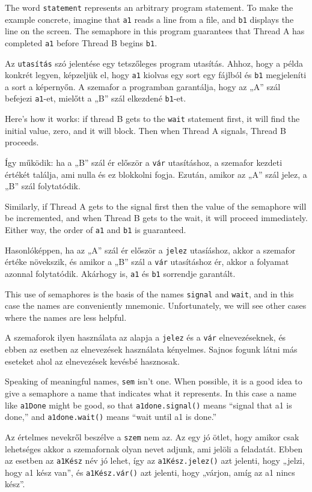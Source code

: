 \documentclass{book}
\begin{document}
The word {\tt statement} represents an arbitrary program statement.
To make the example concrete, imagine that {\tt a1} reads a line
from a file, and {\tt b1} displays the line on the screen.
The semaphore in this program guarantees that Thread A
has completed {\tt a1} before Thread B begins {\tt b1}.

Az {\tt utasítás} szó jelentése egy tetszőleges program utasítás.
Ahhoz, hogy a példa konkrét legyen, képzeljük el, hogy {\tt a1} kiolvas egy
sort egy fájlból és {\tt b1} megjeleníti a sort a képernyőn. A szemafor
a programban garantálja, hogy az „A” szál befejezi {\tt a1}-et, mielőtt
a „B” szál elkezdené {\tt b1}-et.

Here's how it works: if thread B gets to the
{\tt wait} statement first, it will find the initial
value, zero, and it will block.  Then when Thread A signals,
Thread B proceeds.

Így működik: ha a „B” szál ér először a {\tt vár} utasításhoz, a szemafor
kezdeti értékét találja, ami nulla és ez blokkolni fogja. Ezután, amikor
az „A” szál jelez, a „B” szál folytatódik.

Similarly, if Thread A gets to the signal first then the
value of the semaphore will be incremented, and when Thread
B gets to the wait, it will proceed immediately.
Either way, the order of {\tt a1} and {\tt b1} is guaranteed.

Hasonlóképpen, ha az „A” szál ér először a {\tt jelez} utasíáshoz, akkor a szemafor
értéke növekszik, és amikor a „B” szál a {\tt vár} utasításhoz ér, akkor a
folyamat azonnal folytatódik. Akárhogy is, {\tt a1} és {\tt b1}
sorrendje garantált.

This use of semaphores is the basis of the names {\tt signal}
and {\tt wait}, and in this case the names are conveniently
mnemonic.  Unfortunately, we will see other cases where the
names are less helpful.

A szemaforok ilyen használata az alapja a {\tt jelez} és a {\tt vár}
elnevezéseknek, és ebben az esetben az elnevezések használata kényelmes.
Sajnos fogunk látni más eseteket ahol az elnevezések kevésbé hasznosak.

Speaking of meaningful names, {\tt sem} isn't one.  When
possible, it is a good idea to give a semaphore a name
that indicates what it represents.  In this case a name like
{\tt a1Done} might be good, so that {\tt a1done.signal()} means
``signal that a1 is done,'' and {\tt a1done.wait()} means
``wait until a1 is done.''

Az értelmes nevekről beszélve a {\tt szem} nem az. Az egy jó ötlet,
hogy amikor csak lehetséges akkor a szemafornak olyan nevet adjunk,
ami jelöli a feladatát. Ebben az esetben az
{\tt a1Kész} név jó lehet, így az  {\tt a1Kész.jelez()} azt jelenti,
hogy „jelzi, hogy a1 kész van”, és {\tt a1Kész.vár()} azt jelenti,
hogy „várjon, amíg az a1 nincs kész”.
\end{document}
